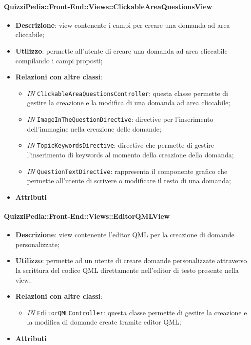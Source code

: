 \paragraph{QuizziPedia::Front-End::Views::ClickableAreaQuestionsView}
\begin{itemize}
	\item \textbf{Descrizione}: view contenente i campi per creare una domanda ad area cliccabile;
	\item \textbf{Utilizzo}:  permette all'utente di creare una domanda ad area cliccabile compilando i campi proposti;
	\item \textbf{Relazioni con altre classi}:
	\begin{itemize}
		\item \textit{IN} \texttt{ClickableAreaQuestionsController}: questa classe permette di gestire la creazione e la modifica di una domanda ad area cliccabile;
		\item \textit{IN} \texttt{ImageInTheQuestionDirective}: directive per l'inserimento dell'immagine nella creazione delle domande;
		\item \textit{IN} \texttt{TopicKeywordsDirective}: directive che permette di gestire l'inserimento di keywords al momento della creazione della domanda;
		\item \textit{IN} \texttt{QuestionTextDirective}: rappresenta il componente grafico che permette all'utente di scrivere o modificare il testo di una domanda;
	\end{itemize}
	\item \textbf{Attributi}
\end{itemize}

\paragraph{QuizziPedia::Front-End::Views::EditorQMLView}
\begin{itemize}
	\item \textbf{Descrizione}: view contenente l'editor QML per la creazione di domande personalizzate;
	\item \textbf{Utilizzo}: permette ad un utente di creare domande personalizzate attraverso la scrittura del codice QML direttamente nell'editor di testo presente nella view;
	\item \textbf{Relazioni con altre classi}:
	\begin{itemize}
		\item \textit{IN} \texttt{EditorQMLController}: questa classe permette di gestire la creazione e la modifica di domande create tramite editor QML;
	\end{itemize}
	\item \textbf{Attributi}
\end{itemize}

